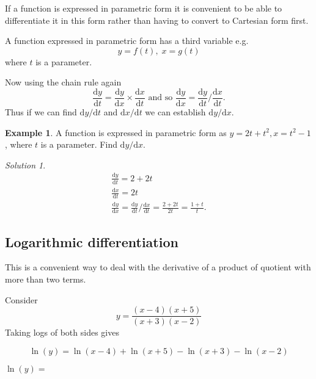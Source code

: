 \documentclass[
  english,
  11pt,
  oneside]{book}
\newcommand{\slide}{}
\theoremstyle{definition}
\theoremstyle{definition}
\newtheorem{example}{Example}[chapter]
\theoremstyle{definition}
\theoremstyle{definition}
\theoremstyle{remark}
\newtheorem*{solution}{Solution}
\begin{document}
If a function is expressed in parametric form it is convenient to be able to differentiate it in this form rather than having to convert to Cartesian form first.

A function expressed in parametric form has a third variable e.g.
\[
y = f(t),\; x = g(t)
\]
where \(t\) is a parameter.

Now using the chain rule again
\[
\frac{\mathrm{d} y}{\mathrm{d} t} = \frac{\mathrm{d} y}{\mathrm{d} x}\times\frac{\mathrm{d} x}{\mathrm{d} t}\text{ and so }\frac{\mathrm{d} y}{\mathrm{d} x} = \frac{\mathrm{d} y}{\mathrm{d} t}/\frac{\mathrm{d} x}{\mathrm{d} t}.
\]
Thus if we can find \(\mathrm{d}y/\mathrm{d} t\) and \(\mathrm{d}x/\mathrm{d} t\) we can establish \(\mathrm{d}y/\mathrm{d} x\).

\slide

\begin{example}
A function is expressed in parametric form as \(y = 2t + t^2, x = t^2 - 1\), where \(t\) is a parameter. Find \(\mathrm{d}y/\mathrm{d} x\).
\end{example}

\begin{solution}
\begin{gather*}
\frac{\mathrm{d} y}{\mathrm{d} t} = 2+2t\\
\frac{\mathrm{d} x}{\mathrm{d} t} = 2t\\
\frac{\mathrm{d} y}{\mathrm{d} x} = \frac{\mathrm{d} y}{\mathrm{d} t}/\frac{\mathrm{d} x}{\mathrm{d} t} = \frac{2+2t}{2t} = \frac{1+t}{t}.
\end{gather*}
\end{solution}

\slide

\subsection{Logarithmic differentiation}\label{logarithmic-differentiation}

This is a convenient way to deal with the derivative of a product of quotient with more than two terms.

Consider
\[
y = \frac{(x-4)(x+5)}{(x+3)(x-2)}
\]
Taking logs of both sides gives

\begin{notslides}

\[
\ln(y) = \ln(x-4)+\ln(x+5)-\ln(x+3)-\ln(x-2)
\]

\end{notslides}

\begin{slidesonly}

\(\ln(y) =\)

\end{slidesonly}
\end{document}
